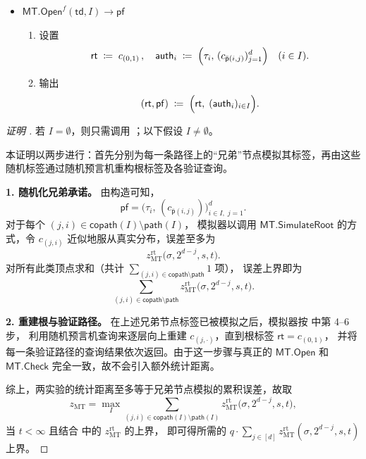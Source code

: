 \documentclass[american,singlepageview]{snargs-book-zh}
\newcommand{\DefineEqual}{\coloneqq}
\newcommand{\ProtoSalt}{\tau}
\newcommand{\ProtoZKError}{z}
\newcommand{\ROFunction}{f}
\newcommand{\ROQueryBound}{t}
\newcommand{\ROOutputSize}{\sigma}
\newcommand{\MTDepth}{d}
\newcommand{\MTPath}{\mathsf{path}}
\newcommand{\MTCoPath}{\mathsf{copath}}
\newcommand{\MTPathCoIndex}[2]{\bar{\mathsf{p}}(#1,#2)}
\newcommand{\MTLayer}{j}
\newcommand{\MTSymbol}{\mathsf{MT}}
\newcommand{\MTSubscript}{{\scriptscriptstyle\mathrm{MT}}}
\newcommand{\MTOpen}{\MTSymbol.\mathsf{Open}}
\newcommand{\MTCheck}{\MTSymbol.\mathsf{Check}}
\newcommand{\MTSimulateRoot}{\MTSymbol.\mathsf{SimulateRoot}}
\newcommand{\MTZKRootError}{\ProtoZKError_{\MTSubscript}^{\mathrm{rt}}}
\newcommand{\MTZKProofError}{\ProtoZKError_{\MTSubscript}}
\newcommand{\MTSaltSize}{s}
\newcommand{\MTVertexLabel}{c}
\newcommand{\MTVertexLabelByName}[2]{\MTVertexLabel_{(#1,#2)}}
\newcommand{\MTVertexLabelByCoPath}[2]{\MTVertexLabel_{\MTPathCoIndex{#1}{#2}}}
\newcommand{\MTCommitment}{\mathsf{rt}}
\newcommand{\MTTrapdoor}{\mathsf{td}}
\newcommand{\MTAuthPath}{\mathsf{auth}}
\newcommand{\MTProof}{\mathsf{pf}}
\newcommand{\MTMessageIndex}{i}
\newcommand{\MTMessageIndexSet}{I}
\newcommand{\MTMessageIndexSetSize}{q}
\newcommand{\MTSaltString}{\ProtoSalt}
\newcommand{\MTPathPrivacyError}{\sum_{\MTLayer \in [\MTDepth]} \MTZKRootError(\ROOutputSize,2^{\MTDepth-\MTLayer},\MTSaltSize,\ROQueryBound)}
\newcommand{\MTProofPrivacyError}{\MTMessageIndexSetSize \cdot \MTPathPrivacyError}
\begin{document}
\begin{itemize}[leftmargin=*]
  \item $\MTOpen^{\ROFunction}(\MTTrapdoor, \MTMessageIndexSet) \to \MTProof$
  \begin{enumerate}[nolistsep]
    \item 设置
  \[
    \MTCommitment \;\DefineEqual\;\MTVertexLabelByName{0}{1}\,,
    \quad
    \MTAuthPath_{\MTMessageIndex}
    \;\DefineEqual\;\Bigl(\MTSaltString_{\MTMessageIndex},\,
      (\MTVertexLabelByCoPath{\MTMessageIndex}{\MTLayer})_{\MTLayer=1}^{\MTDepth}
    \Bigr)
    \quad(\MTMessageIndex\in\MTMessageIndexSet).
  \]
  \item 输出
  \[
    (\MTCommitment,\MTProof)
    \;\DefineEqual\;
    \Bigl(\MTCommitment,\;
      (\MTAuthPath_{\MTMessageIndex})_{\MTMessageIndex\in\MTMessageIndexSet}
    \Bigr).
  \]
\end{enumerate}
\end{itemize}

\begin{proof}[证明 ]
若 $\MTMessageIndexSet=\emptyset$，则只需调用 ；以下假设 $\MTMessageIndexSet\neq\emptyset$。

本证明以两步进行：首先分别为每一条路径上的“兄弟”节点模拟其标签，再由这些随机标签通过随机预言机重构根标签及各验证查询。

\medskip
\textbf{1. 随机化兄弟承诺。}
由构造可知，
\[
  \MTProof
  =
  \bigl(\MTSaltString_{\MTMessageIndex},\,
    (\MTVertexLabelByCoPath{\MTMessageIndex}{\MTLayer})
  \bigr)_{\MTMessageIndex\in\MTMessageIndexSet,\;\MTLayer=1}^{\MTDepth}.
\]
对于每个 $(\MTLayer,\MTMessageIndex)\in
  \MTCoPath(\MTMessageIndexSet)\setminus\MTPath(\MTMessageIndexSet)$，
模拟器以调用 $\MTSimulateRoot$ 的方式，令 $\MTVertexLabelByName{\MTLayer}{\MTMessageIndex}$
近似地服从真实分布，误差至多为
\[
  \MTZKRootError\bigl(\ROOutputSize,2^{\MTDepth-\MTLayer},\MTSaltSize,\ROQueryBound\bigr).
\]
对所有此类顶点求和（共计
$\sum_{(\MTLayer,\MTMessageIndex)\in\MTCoPath\setminus\MTPath}1$ 项），
误差上界即为
\[
  \sum_{(\MTLayer,\MTMessageIndex)\in\MTCoPath\setminus\MTPath}
  \MTZKRootError\bigl(\ROOutputSize,2^{\MTDepth-\MTLayer},\MTSaltSize,\ROQueryBound\bigr).
\]

\medskip
\textbf{2. 重建根与验证路径。}
在上述兄弟节点标签已被模拟之后，模拟器按  中第 4–6 步，
利用随机预言机查询来逐层向上重建
$\MTVertexLabelByName{\MTLayer}{\cdot}$，直到根标签 $\MTCommitment=\MTVertexLabelByName{0}{1}$，
并将每一条验证路径的查询结果依次返回。由于这一步骤与真正的
$\MTOpen$ 和 $\MTCheck$ 完全一致，故不会引入额外统计距离。

\medskip
综上，两实验的统计距离至多等于兄弟节点模拟的累积误差，故取
\[
  \MTZKProofError
  = \max_{\MTMessageIndexSet}
    \sum_{(\MTLayer,\MTMessageIndex)\in\MTCoPath(\MTMessageIndexSet)\setminus\MTPath(\MTMessageIndexSet)}
    \MTZKRootError\bigl(\ROOutputSize,2^{\MTDepth-\MTLayer},\MTSaltSize,\ROQueryBound\bigr),
\]
当 $\ROQueryBound<\infty$ 且结合  中的
$\MTZKRootError$ 的上界，
即可得所需的 $\MTProofPrivacyError$ 上界。
\end{proof}
\end{document}
